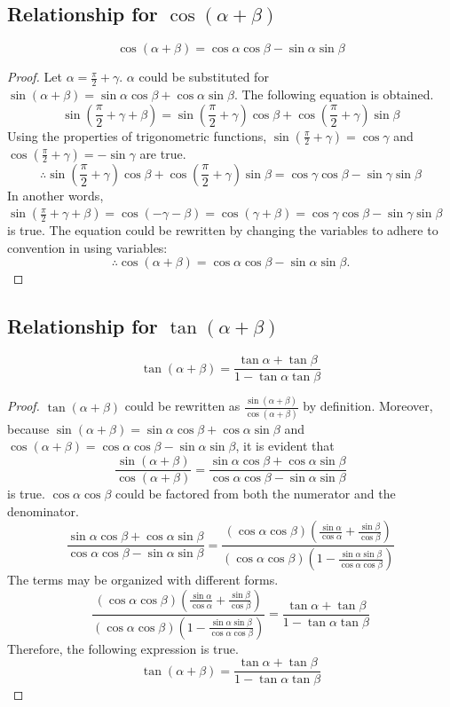 \documentclass{article}
\begin{document}
\subsection{Relationship for $\cos(\alpha + \beta)$}
\[
\cos(\alpha + \beta)
= \cos\alpha \cos\beta - \sin\alpha \sin\beta
\]
\begin{proof}
Let $\alpha = \frac{\pi}{2} + \gamma$. $\alpha$ could
be substituted for $\sin(\alpha + \beta) =
\sin\alpha \cos\beta + \cos\alpha \sin\beta$. The
following equation is obtained.
\[
\sin(\frac{\pi}{2} + \gamma + \beta)
= \sin(\frac{\pi}{2} + \gamma) \cos\beta
    + \cos(\frac{\pi}{2} + \gamma) \sin\beta
\]
Using the properties of trigonometric functions,
$\sin(\frac{\pi}{2} + \gamma) = \cos\gamma$ and
$\cos(\frac{\pi}{2} + \gamma) = -\sin\gamma$ are true.
\[
\therefore \sin(\frac{\pi}{2} + \gamma) \cos\beta +
    \cos(\frac{\pi}{2} + \gamma) \sin\beta
= \cos\gamma \cos\beta - \sin\gamma \sin\beta
\]
In another words, $\sin(\frac{\pi}{2} + \gamma + \beta)
= \cos(-\gamma - \beta) = \cos(\gamma + \beta)
= \cos\gamma \cos\beta - \sin\gamma \sin\beta$ is true.
The equation could be rewritten by changing the variables
to adhere to convention in using variables:
\[
\therefore \cos(\alpha + \beta)
= \cos\alpha \cos\beta - \sin\alpha \sin\beta.
\]
\end{proof}


\subsection{Relationship for $\tan(\alpha+\beta)$}
\[
\tan(\alpha+\beta)=\frac{\tan\alpha+\tan\beta}{1-\tan\alpha\tan\beta}
\]
\begin{proof}
    $\tan(\alpha+\beta)$ could be rewritten as $\frac{\sin(\alpha+\beta)}{\cos(\alpha+\beta)}$ by definition. Moreover, because $\sin(\alpha+\beta)=\sin\alpha\cos\beta+\cos\alpha\sin\beta$ and $\cos(\alpha+\beta)=\cos\alpha\cos\beta-\sin\alpha\sin\beta$, it is evident that
    \[
    \frac{\sin(\alpha+\beta)}{\cos(\alpha+\beta)}=\frac{\sin\alpha\cos\beta+\cos\alpha\sin\beta}{\cos\alpha\cos\beta-\sin\alpha\sin\beta}
    \] is true. $\cos\alpha\cos\beta$ could be factored from both the numerator and the denominator.
    \[
    \frac{\sin\alpha\cos\beta+\cos\alpha\sin\beta}{\cos\alpha\cos\beta-\sin\alpha\sin\beta}=\frac{(\cos\alpha\cos\beta)(\frac{\sin\alpha}{\cos\alpha}+\frac{\sin\beta}{\cos\beta})}{(\cos\alpha\cos\beta)(1-\frac{\sin\alpha\sin\beta}{\cos\alpha\cos\beta})}
    \]
    The terms may be organized with different forms.
    \[
    \frac{(\cos\alpha\cos\beta)(\frac{\sin\alpha}{\cos\alpha}+\frac{\sin\beta}{\cos\beta})}{(\cos\alpha\cos\beta)(1-\frac{\sin\alpha\sin\beta}{\cos\alpha\cos\beta})}=\frac{\tan\alpha+\tan\beta}{1-\tan\alpha\tan\beta}
    \]
    Therefore, the following expression is true.
    \[
    \tan(\alpha+\beta)=\frac{\tan\alpha+\tan\beta}{1-\tan\alpha\tan\beta}
    \]
\end{proof}
\end{document}
